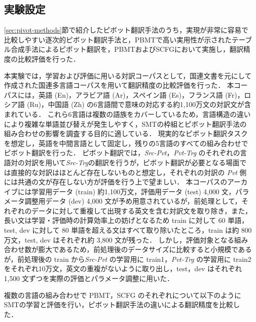 \documentclass[japanese]{jnlp_1.4}
\begin{document}
\subsection{実験設定}
\label{sec:experiment-scfg}

\ref{sec:pivot-methods}節で紹介したピボット翻訳手法のうち，実現が非常に容易で比較しやすい逐次的ピボット翻訳手法と，PBMTで高い実用性が示されたテーブル合成手法によるピボット翻訳を，PBMTおよびSCFGにおいて実施し，翻訳精度の比較評価を行った．

本実験では，学習および評価に用いる対訳コーパスとして，国連文書を元にして作成された国連多言語コーパス\cite{ziemski16un}を用いて翻訳精度の比較評価を行った．
本コーパスには，英語 (En)，アラビア語 (Ar)，スペイン語 (Es)，フランス語 (Fr)，ロシア語 (Ru)，中国語 (Zh) の6言語間で意味の対応する約1,100万文の対訳文が含まれている．
これら6言語は複数の語族をカバーしているため，言語構造の違いにより複雑な単語並び替えが発生しやすく，SMTの枠組とピボット翻訳手法の組み合わせの影響を調査する目的に適している．
現実的なピボット翻訳タスクを想定し，英語を中間言語として固定し，残りの5言語のすべての組み合わせでピボット翻訳を行った．
ピボット翻訳では，\textit{Src-Pvt}，\textit{Pvt-Trg} のそれぞれの言語対の対訳を用いて\textit{Src-Trg}の翻訳を行うが，ピボット翻訳が必要となる場面では直接的な対訳はほとんど存在しないものと想定し，それぞれの対訳の \textit{Pvt} 側には共通の文が存在しない方が評価を行う上で望ましい．
本コーパスのアーカイブには学習用データ (train) 約1,100万文，評価用データ (test) 4,000 文，パラメータ調整用データ (dev) 4,000 文が予め用意されているが，前処理として，それぞれのデータに対して重複して出現する英文を含む対訳文を取り除き，また，長い文は学習・評価時の計算効率上の妨げとなるため train に対して 60 単語，test, dev に対して 80 単語を超える文はすべて取り除いたところ，train は約 800 万文，test, dev はそれぞれ約 3,800 文が残った．
しかし，評価対象となる組み合わせ数が膨大であるため，前処理後のデータサイズに比較すると小規模であるが，前処理後の train から\textit{Src-Pvt} の学習用に train1，\textit{Pvt-Trg} の学習用に train2 をそれぞれ10万文，英文の重複がないように取り出し，test，dev はそれぞれ 1,500 文ずつを実際の評価とパラメータ調整に用いた．

複数の言語の組み合わせで PBMT，SCFG のそれぞれについて以下のようにSMTの学習と評価を行い，ピボット翻訳手法の違いによる翻訳精度を比較した．
\end{document}
